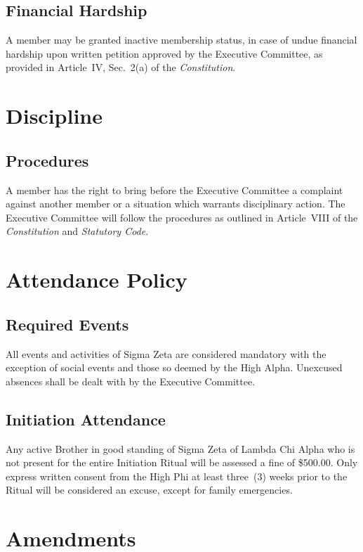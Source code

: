 \documentclass{article}
\begin{document}
\subsection{Financial Hardship}

A member may be granted inactive membership status, in case of undue financial
hardship upon written petition approved by the Executive Committee, as provided
in Article~IV, Sec.~2(a) of the \emph{Constitution}.

\section{Discipline}
\subsection{Procedures}

A member has the right to bring before the Executive Committee a complaint
against another member or a situation which warrants disciplinary action. The
Executive Committee will follow the procedures as outlined in Article~VIII of
the \emph{Constitution} and \emph{Statutory Code}.

\section{Attendance Policy}\label{Attendance Policy}

\subsection{Required Events}

All events and activities of Sigma Zeta are considered mandatory with the
exception of social events and those so deemed by the High Alpha. Unexcused
absences shall be dealt with by the Executive Committee.

\subsection{Initiation Attendance}

Any active Brother in good standing of Sigma Zeta of Lambda Chi Alpha who is not
present for the entire Initiation Ritual will be assessed a fine of \$500.00.
Only express written consent from the High Phi at least three~(3) weeks prior to
the Ritual will be considered an excuse, except for family emergencies.

\section{Amendments}
\end{document}
